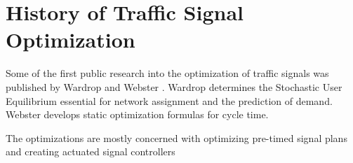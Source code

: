 \section{History of Traffic Signal Optimization}
\label{history}

Some of the first public research into the optimization of traffic signals was published by Wardrop \cite{Wardrop} and Webster \cite{Webster}. Wardrop determines the Stochastic User Equilibrium essential for network assignment and the prediction of demand. Webster develops static optimization formulas for cycle time.

The optimizations are mostly concerned with optimizing pre-timed signal plans and creating actuated signal controllers